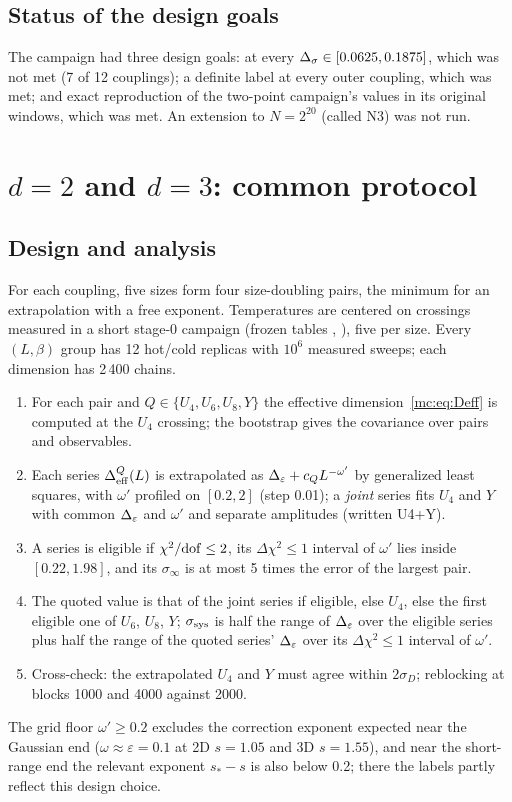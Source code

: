 \subsection{Status of the design goals}
The campaign had three design goals:  at every $\Delta_\sigma\in[0.0625,0.1875]$, which was not met (7 of 12 couplings); a definite label
at every outer coupling, which was met; and exact reproduction of the two-point campaign's values in its original windows, which was met. An
extension to $N=2^{20}$ (called N3) was not run.

\section{\texorpdfstring{$d=2$ and $d=3$: common protocol}{d=2 and d=3: common protocol}}\label{mc:sec:proto23}
\subsection{Design and analysis}
For each coupling, five sizes form four size-doubling pairs, the minimum for an extrapolation with a free exponent. Temperatures are centered
on crossings measured in a short stage-0 campaign (frozen tables ,
), five per size. Every $(L,\beta)$ group has 12 hot/cold replicas with $10^6$ measured sweeps; each
dimension has 2\,400 chains.
\begin{enumerate}[1.]
\item For each pair and $Q\in\{U_4,U_6,U_8,Y\}$ the effective dimension~\eqref{mc:eq:Deff} is computed at the $U_4$ crossing; the bootstrap gives
 the covariance over pairs and observables.
\item Each series $\Delta_{\rm eff}^Q(L)$ is extrapolated as $\Delta_\varepsilon+c_QL^{-\omega'}$ by generalized least squares, with $\omega'$ profiled on $[0.2,2]$ (step
 0.01); a \emph{joint} series fits $U_4$ and $Y$ with common $\Delta_\varepsilon$ and $\omega'$ and separate amplitudes (written U4+Y).
\item A series is eligible if $\chi^2/{\rm dof}\le2$, its $\Delta\chi^2\le1$ interval of $\omega'$ lies inside $[0.22,1.98]$, and its
 $\sigma_\infty$ is at most 5 times the error of the largest pair.
\item The quoted value is that of the joint series if eligible, else $U_4$, else the first eligible one of $U_6$, $U_8$, $Y$; $\sigma_{\rm sys}$ is half
 the range of $\Delta_\varepsilon$ over the eligible series plus half the range of the quoted series' $\Delta_\varepsilon$ over its $\Delta\chi^2\le1$ interval of $\omega'$.
\item Cross-check: the extrapolated $U_4$ and $Y$ must agree within $2\sigma_D$; reblocking at blocks 1000 and 4000 against 2000.
\end{enumerate}
The grid floor $\omega'\ge0.2$ excludes the correction exponent expected near the Gaussian end ($\omega\approx\varepsilon=0.1$ at 2D $s=1.05$
and 3D $s=1.55$), and near the short-range end the relevant exponent $s_*-s$ is also below 0.2; there the labels partly reflect this design
choice.

